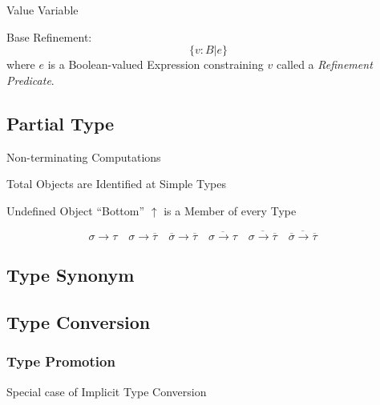 Value Variable

Base Refinement:
\[
  \{ v : B | e \}
\]
where $e$ is a Boolean-valued Expression constraining $v$ called a
\emph{Refinement Predicate}.



\subsection{Partial Type}\label{sec:partial_type}

\cite{thompson99}

Non-terminating Computations

Total Objects are Identified at Simple Types

Undefined Object ``Bottom'' $\uparrow$ is a Member of every Type

\[
  \sigma \rightarrow \tau \quad
  \sigma \rightarrow \overline{\tau} \quad
  \overline{\sigma} \rightarrow \overline{\tau} \quad
  \overline{\sigma \rightarrow \tau} \quad
  \overline{\sigma \rightarrow \overline{\tau}} \quad
  \overline{\overline{\sigma} \rightarrow \overline{\tau}} \quad
\]



\subsection{Type Synonym}\label{sec:type_synonym}

\subsection{Type Conversion}\label{sec:type_conversion}

\subsubsection{Type Promotion}\label{sec:type_promotion}

Special case of Implicit Type Conversion



